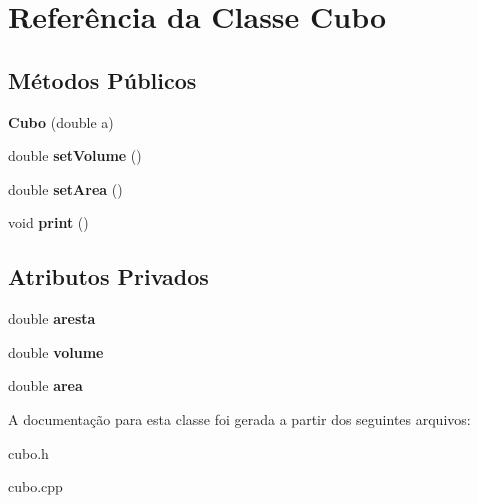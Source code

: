 \hypertarget{classCubo}{}\section{Referência da Classe Cubo}
\label{classCubo}
\subsection*{Métodos Públicos}
\begin{DoxyCompactItemize}
\item 
{\bfseries Cubo} (double a)\hypertarget{classCubo_a70acdf3c9aec7c388160a13a824d12fd}{}\label{classCubo_a70acdf3c9aec7c388160a13a824d12fd}

\item 
double {\bfseries set\+Volume} ()\hypertarget{classCubo_af796ef42345b75cb20f2950bbdc51e8a}{}\label{classCubo_af796ef42345b75cb20f2950bbdc51e8a}

\item 
double {\bfseries set\+Area} ()\hypertarget{classCubo_af393cb6a26a51ab5a98fcc2d21c624a8}{}\label{classCubo_af393cb6a26a51ab5a98fcc2d21c624a8}

\item 
void {\bfseries print} ()\hypertarget{classCubo_a0fac809c10cadbfc11cd30bed5e9fd8c}{}\label{classCubo_a0fac809c10cadbfc11cd30bed5e9fd8c}

\end{DoxyCompactItemize}
\subsection*{Atributos Privados}
\begin{DoxyCompactItemize}
\item 
double {\bfseries aresta}\hypertarget{classCubo_a39149222459aefe5ab101564dd86ada3}{}\label{classCubo_a39149222459aefe5ab101564dd86ada3}

\item 
double {\bfseries volume}\hypertarget{classCubo_a941a71e94217cb1cfc09b93327d10b9e}{}\label{classCubo_a941a71e94217cb1cfc09b93327d10b9e}

\item 
double {\bfseries area}\hypertarget{classCubo_ae8f4d549ee5cfd49bb1cdd7f00d435f8}{}\label{classCubo_ae8f4d549ee5cfd49bb1cdd7f00d435f8}

\end{DoxyCompactItemize}


A documentação para esta classe foi gerada a partir dos seguintes arquivos\+:\begin{DoxyCompactItemize}
\item 
cubo.\+h\item 
cubo.\+cpp\end{DoxyCompactItemize}
